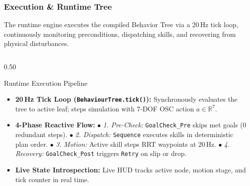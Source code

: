 \documentclass[10pt]{beamer}
\begin{document}
\begin{frame}[fragile,t]
\frametitle{Execution \& Runtime Tree}
\footnotesize
The runtime engine executes the compiled Behavior Tree via a 20\,Hz tick loop, continuously monitoring preconditions, dispatching skills, and recovering from physical disturbances.

\vspace{0.01cm}
\begin{columns}[T]
    \begin{column}{0.50\textwidth}
        \begin{block}{Runtime Execution Pipeline}
            \begin{itemize}\scriptsize
                \setlength\itemsep{0.05em}
                \item \textbf{20\,Hz Tick Loop (\texttt{BehaviourTree.tick()}):}
                \newline Synchronously evaluates the tree to active leaf; steps simulation with 7-DOF OSC action $a \in \mathbb{R}^7$.
                \item \textbf{4-Phase Reactive Flow:}
                \newline $\bullet$ \textit{1. Pre-Check:} \texttt{GoalCheck\_Pre} skips met goals ($0$ redundant steps).
                \newline $\bullet$ \textit{2. Dispatch:} \texttt{Sequence} executes skills in deterministic plan order.
                \newline $\bullet$ \textit{3. Motion:} Active skill steps RRT waypoints at 20\,Hz.
                \newline $\bullet$ \textit{4. Recovery:} \texttt{GoalCheck\_Post} triggers \texttt{Retry} on slip or drop.
                \item \textbf{Live State Introspection:}
                \newline Live HUD tracks active node, motion stage, and tick counter in real time.
            \end{itemize}
        \end{block}
    \end{column}


\end{columns}
\end{frame}
\end{document}
